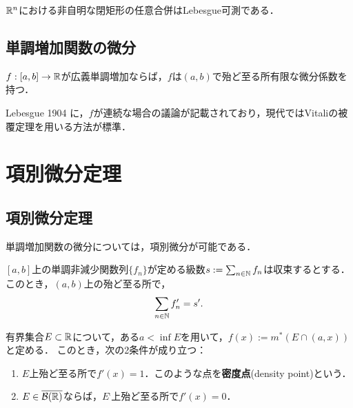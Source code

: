 \documentclass[uplatex, dvipdfmx]{jsreport}
\begin{document}
\begin{corollary}\label{cor-Vitali}
    $\mathbb{R}^n$における非自明な閉矩形の任意合併はLebesgue可測である．
\end{corollary}

\subsection{単調増加関数の微分}

\begin{theorem}[Lebesgue]
    $f:[a,b]\to\mathbb{R}$が広義単調増加ならば，$f$は$(a,b)$で殆ど至る所有限な微分係数を持つ．
\end{theorem}
\begin{history}
    Lebesgue 1904 \cite{Lebesgue04}に，$f$が連続な場合の議論が記載されており，現代ではVitaliの被覆定理を用いる方法が標準．
\end{history}

\section{項別微分定理}

\subsection{項別微分定理}

\begin{tcolorbox}[colframe=ForestGreen, colback=ForestGreen!10!white,breakable,colbacktitle=ForestGreen!40!white,coltitle=black,fonttitle=\bfseries\sffamily,
title=]
    単調増加関数の微分については，項別微分が可能である．
\end{tcolorbox}

\begin{theorem}[Fubiniの項別微分定理 (1915)]
    $[a,b]$上の単調非減少関数列$\{f_n\}$が定める級数$s:=\sum_{n\in\mathbb{N}}f_n$は収束するとする．
    このとき，$(a,b)$上の殆ど至る所で，
    \[\sum_{n\in\mathbb{N}}f'_n=s'.\]
\end{theorem}

\begin{theorem}[Lebesgueの密度定理 (1904)]
    有界集合$E\subset\mathbb{R}$について，ある$a<\inf E$を用いて，$f(x):=m^*(E\cap(a,x))$と定める．
    このとき，次の2条件が成り立つ：
    \begin{enumerate}
        \item $E$上殆ど至る所で$f'(x)=1$．このような点を\textbf{密度点}(density point)という．
        \item $E\in\overline{\mathcal{B}(\mathbb{R})}$ならば，$E^\comp$上殆ど至る所で$f'(x)=0$．
    \end{enumerate}
\end{theorem}
\end{document}
